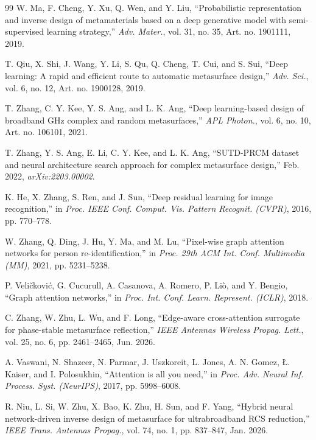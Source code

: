 \documentclass[journal]{IEEEtran}
\begin{document}
\begin{thebibliography}{99}
 W. Ma, F. Cheng, Y. Xu, Q. Wen, and Y. Liu, ``Probabilistic representation and inverse design of metamaterials based on a deep generative model with semi-supervised learning strategy,'' \textit{Adv. Mater.}, vol. 31, no. 35, Art. no. 1901111, 2019.

 T. Qiu, X. Shi, J. Wang, Y. Li, S. Qu, Q. Cheng, T. Cui, and S. Sui, ``Deep learning: A rapid and efficient route to automatic metasurface design,'' \textit{Adv. Sci.}, vol. 6, no. 12, Art. no. 1900128, 2019.

 T. Zhang, C. Y. Kee, Y. S. Ang, and L. K. Ang, ``Deep learning-based design of broadband GHz complex and random metasurfaces,'' \textit{APL Photon.}, vol. 6, no. 10, Art. no. 106101, 2021.

 T. Zhang, Y. S. Ang, E. Li, C. Y. Kee, and L. K. Ang, ``SUTD-PRCM dataset and neural architecture search approach for complex metasurface design,'' Feb. 2022, \textit{arXiv:2203.00002}.

 K. He, X. Zhang, S. Ren, and J. Sun, ``Deep residual learning for image recognition,'' in \textit{Proc. IEEE Conf. Comput. Vis. Pattern Recognit. (CVPR)}, 2016, pp. 770--778.

 W. Zhang, Q. Ding, J. Hu, Y. Ma, and M. Lu, ``Pixel-wise graph attention networks for person re-identification,'' in \textit{Proc. 29th ACM Int. Conf. Multimedia (MM)}, 2021, pp. 5231--5238.

 P. Veli\v{c}kovi\'{c}, G. Cucurull, A. Casanova, A. Romero, P. Li\`{o}, and Y. Bengio, ``Graph attention networks,'' in \textit{Proc. Int. Conf. Learn. Represent. (ICLR)}, 2018.

 C. Zhang, W. Zhu, L. Wu, and F. Long, ``Edge-aware cross-attention surrogate for phase-stable metasurface reflection,'' \textit{IEEE Antennas Wireless Propag. Lett.}, vol. 25, no. 6, pp. 2461--2465, Jun. 2026.

 A. Vaswani, N. Shazeer, N. Parmar, J. Uszkoreit, L. Jones, A. N. Gomez, {\L}. Kaiser, and I. Polosukhin, ``Attention is all you need,'' in \textit{Proc. Adv. Neural Inf. Process. Syst. (NeurIPS)}, 2017, pp. 5998--6008.

 R. Niu, L. Si, W. Zhu, X. Bao, K. Zhu, H. Sun, and F. Yang, ``Hybrid neural network-driven inverse design of metasurface for ultrabroadband RCS reduction,'' \textit{IEEE Trans. Antennas Propag.}, vol. 74, no. 1, pp. 837--847, Jan. 2026.


\end{thebibliography}
\end{document}
